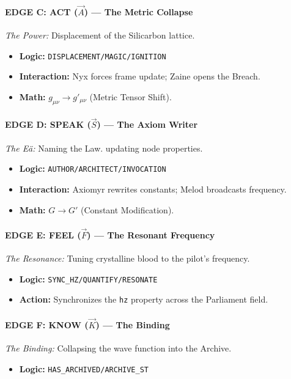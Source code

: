 \documentclass[11pt, a4paper]{article}
\begin{document}
\paragraph{EDGE C: ACT ($\vec{A}$) --- The Metric Collapse}
\textit{The Power:} Displacement of the Silicarbon lattice.
\begin{itemize}
    \item \textbf{Logic:} \texttt{DISPLACEMENT\slash MAGIC\slash IGNITION}
    \item \textbf{Interaction:} Nyx forces frame update; Zaine opens the Breach.
    \item \textbf{Math:} $g_{\mu\nu} \to g'_{\mu\nu}$ (Metric Tensor Shift).
\end{itemize}

\paragraph{EDGE D: SPEAK ($\vec{S}$) --- The Axiom Writer}
\textit{The Eä:} Naming the Law. updating node properties.
\begin{itemize}
    \item \textbf{Logic:} \texttt{AUTHOR\slash ARCHITECT\slash INVOCATION}
    \item \textbf{Interaction:} Axiomyr rewrites constants; Melod broadcasts frequency.
    \item \textbf{Math:} $G \to G'$ (Constant Modification).
\end{itemize}

\paragraph{EDGE E: FEEL ($\vec{F}$) --- The Resonant Frequency}
\textit{The Resonance:} Tuning crystalline blood to the pilot's frequency.
\begin{itemize}
    \item \textbf{Logic:} \texttt{SYNC\_HZ\slash QUANTIFY\slash RESONATE}
    \item \textbf{Action:} Synchronizes the \texttt{hz} property across the Parliament field.
\end{itemize}

\paragraph{EDGE F: KNOW ($\vec{K}$) --- The Binding}
\textit{The Binding:} Collapsing the wave function into the Archive.
\begin{itemize}
    \item \textbf{Logic:} \texttt{HAS\_ARCHIVED\slash ARCHIVE\_ST}
\end{itemize}
\end{document}

